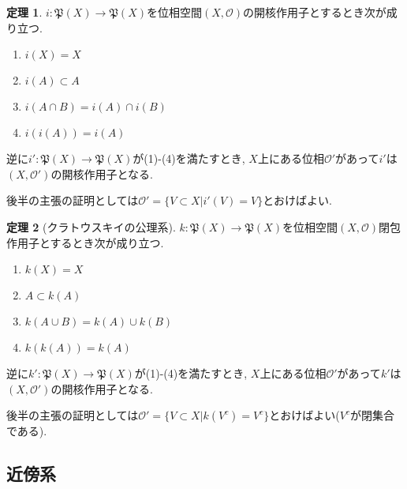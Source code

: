 \documentclass[dvipdfmx,a4paper,11pt]{article}
\theoremstyle{definition}
\newtheorem{thm}{定理}
\begin{document}
 \begin{tcolorbox}[
    colback = white,
    colframe = green!35!black,
    fonttitle = \bfseries,
    breakable = true]
    \begin{thm}
    \text{}
$i: \mathfrak{P}(X) \rightarrow \mathfrak{P}(X)$を位相空間$(X, \mathscr{O} )$の開核作用子とするとき次が成り立つ.
    \begin{enumerate}
     \setlength{\parskip}{0cm} 
  \setlength{\itemsep}{0cm} 
    \item $i(X)=X $
    \item $i(A) \subset A$
    \item $i(A \cap B) =i(A) \cap i(B)$
    \item $i(i(A)) =i(A)$
    \end{enumerate}
逆に$i': \mathfrak{P}(X) \rightarrow \mathfrak{P}(X)$が(1)-(4)を満たすとき, $X$上にある位相$\mathscr{O}'$があって$i'$は$(X, \mathscr{O}')$の開核作用子となる.
  \end{thm}
 \end{tcolorbox}
 後半の主張の証明としては$ \mathscr{O}' = \{ V\subset X | i'(V)=V\}$とおけばよい.
 
  \begin{tcolorbox}[
    colback = white,
    colframe = green!35!black,
    fonttitle = \bfseries,
    breakable = true]
    \begin{thm}[クラトウスキイの公理系]
    \text{}
$k: \mathfrak{P}(X) \rightarrow \mathfrak{P}(X)$を位相空間$(X, \mathscr{O} )$閉包作用子とするとき次が成り立つ.
    \begin{enumerate}
     \setlength{\parskip}{0cm} 
  \setlength{\itemsep}{0cm} 
    \item $k(X)=X $
    \item $A\subset k(A)$
    \item $k(A \cup B) =k(A) \cup k(B)$
    \item $k(k(A)) =k(A)$
    \end{enumerate}
逆に$k': \mathfrak{P}(X) \rightarrow \mathfrak{P}(X)$が(1)-(4)を満たすとき, $X$上にある位相$\mathscr{O}'$があって$k'$は$(X, \mathscr{O}')$の開核作用子となる.
  \end{thm}
 \end{tcolorbox}
 後半の主張の証明としては$ \mathscr{O}' = \{ V \subset X | k(V^c)=V^c\}$とおけばよい($V^c$が閉集合である).

\subsection{近傍系}
\end{document}
